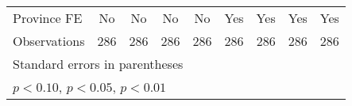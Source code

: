 {\begin{tabular}{l*{8}{c}}
Province FE     &       No         &       No         &       No         &       No         &      Yes         &      Yes         &      Yes         &      Yes         \\
Observations    &      286         &      286         &      286         &      286         &      286         &      286         &      286         &      286         \\
\hline\hline
\multicolumn{9}{l}{\footnotesize Standard errors in parentheses}\\
\multicolumn{9}{l}{\footnotesize \sym{*} \(p<0.10\), \sym{**} \(p<0.05\), \sym{***} \(p<0.01\)}\\
\end{tabular}
}
